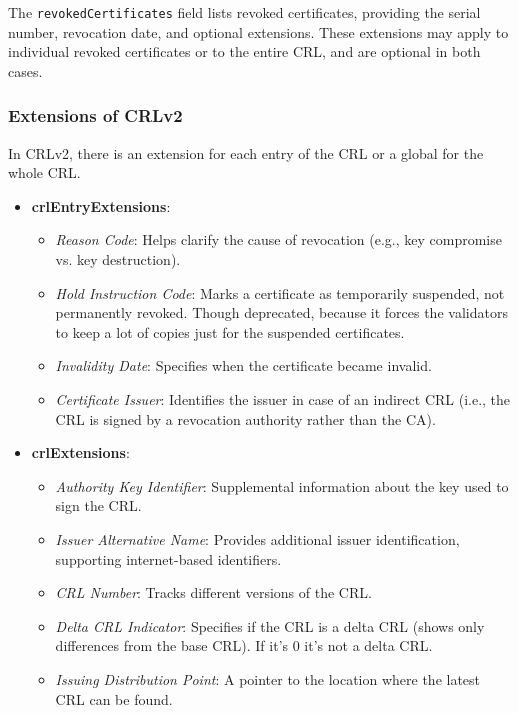 The \texttt{revokedCertificates} field lists revoked certificates, 
providing the serial number, revocation date, and optional 
extensions. These extensions may apply to individual revoked 
certificates or to the entire CRL, and are optional in both cases.


\subsubsection{Extensions of CRLv2}
In CRLv2, there is an extension for each entry of the CRL or a global
for the whole CRL.

\begin{itemize}
    \item \textbf{crlEntryExtensions}:
    \begin{itemize}
        \item \textit{Reason Code}: Helps clarify the cause of
          revocation (e.g., key compromise vs. key destruction).
        \item \textit{Hold Instruction Code}: Marks a certificate as
          temporarily suspended, not permanently revoked. Though
          deprecated, because it forces the validators to keep a lot
          of copies just for the suspended certificates. 
        \item \textit{Invalidity Date}: Specifies when the certificate
          became invalid.
        \item \textit{Certificate Issuer}: Identifies the issuer in
          case of an indirect CRL (i.e., the CRL is signed by a
          revocation authority rather than the CA).
    \end{itemize}
    
    \item \textbf{crlExtensions}:
    \begin{itemize}
        \item \textit{Authority Key Identifier}: Supplemental
          information about the key used to sign the CRL.
        \item \textit{Issuer Alternative Name}: Provides additional
          issuer identification, supporting internet-based
          identifiers.
        \item \textit{CRL Number}: Tracks different versions of the CRL.
        \item \textit{Delta CRL Indicator}: Specifies if the CRL is a
          delta CRL (shows only differences from the base CRL). If
          it's 0 it's not a delta CRL.
        \item \textit{Issuing Distribution Point}: A pointer to the
          location where the latest CRL can be found.
    \end{itemize}
\end{itemize}

